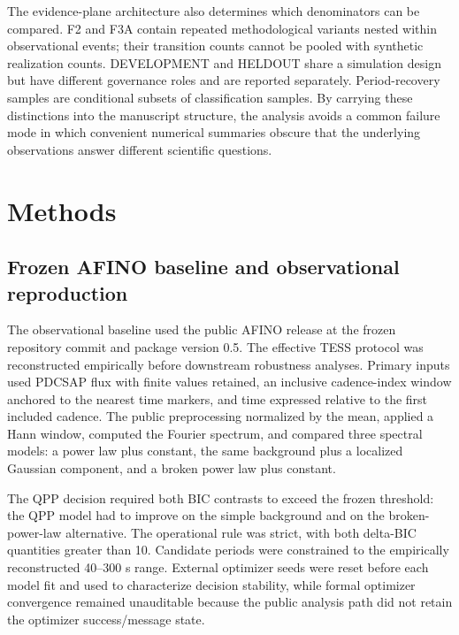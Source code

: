 \documentclass[11pt,a4paper]{article}
\begin{document}
The evidence-plane architecture also determines which denominators can be compared. F2 and F3A contain repeated methodological variants nested within observational events; their transition counts cannot be pooled with synthetic realization counts. DEVELOPMENT and HELDOUT share a simulation design but have different governance roles and are reported separately. Period-recovery samples are conditional subsets of classification samples. By carrying these distinctions into the manuscript structure, the analysis avoids a common failure mode in which convenient numerical summaries obscure that the underlying observations answer different scientific questions.

\section{Methods}
\subsection{Frozen AFINO baseline and observational reproduction}
The observational baseline used the public AFINO release at the frozen repository commit and package version 0.5. The effective TESS protocol was reconstructed empirically before downstream robustness analyses. Primary inputs used PDCSAP flux with finite values retained, an inclusive cadence-index window anchored to the nearest time markers, and time expressed relative to the first included cadence. The public preprocessing normalized by the mean, applied a Hann window, computed the Fourier spectrum, and compared three spectral models: a power law plus constant, the same background plus a localized Gaussian component, and a broken power law plus constant.

The QPP decision required both BIC contrasts to exceed the frozen threshold: the QPP model had to improve on the simple background and on the broken-power-law alternative. The operational rule was strict, with both delta-BIC quantities greater than 10. Candidate periods were constrained to the empirically reconstructed 40--300 s range. External optimizer seeds were reset before each model fit and used to characterize decision stability, while formal optimizer convergence remained unauditable because the public analysis path did not retain the optimizer success/message state.
\end{document}
